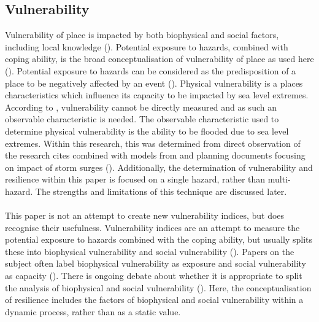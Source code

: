 \subsection{Vulnerability}
Vulnerability of place is impacted by both biophysical and social factors, including local knowledge (\cite{opach_seeking_2020}).  Potential exposure to hazards, combined with coping ability, is the broad conceptualisation of vulnerability of place as used here (\cite{rygel_method_2006}). Potential exposure to hazards can be considered as the predisposition of a place to be negatively affected by an event (\cite{lujala_quantifying_2014}).  Physical vulnerability is a places characteristics which influence its capacity to be impacted by sea level extremes. According to \cite{rod_integrated_2012}, vulnerability cannot be directly measured and as such an observable characteristic is needed.  The observable characteristic used to determine physical vulnerability is the ability to be flooded due to sea level extremes. Within this research, this was determined from direct observation of the research cites combined with models from \cite{kartverket_se_2020} and planning documents focusing on impact of storm surges (\cite{miljoenheten_og_byplankontoret_trondheim_kommune_9-notat-om-havnivastigning-og-stormflo---hensyn-i-arealplanlegging-nyhavnapdf_2020}). Additionally, the determination of vulnerability and resilience within this paper is focused on a single hazard, rather than multi-hazard. The strengths and limitations of this technique are discussed later. 
\paragraph{}
This paper is not an attempt to create new vulnerability indices, but does recognise their usefulness. Vulnerability indices are an attempt to measure the potential exposure to hazards combined with the coping ability, but usually splits these into biophysical vulnerability  and social vulnerability (\cite{rod_integrated_2012}). Papers on the subject often label biophysical vulnerability as exposure and social vulnerability as capacity (\cite{rod_integrated_2012}). There is ongoing debate about whether it is appropriate to split the analysis of biophysical and social vulnerability (\cite{lujala_quantifying_2014}). Here, the conceptualisation of resilience includes the factors of biophysical and social vulnerability within a dynamic process, rather than as a static value.

